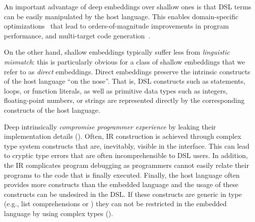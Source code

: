   An important advantage of deep embeddings over shallow ones is that DSL
  terms can be easily manipulated by the host language. This enables domain-specific
  optimizations~\cite{rompf_lightweight_2012,rompf_optimizing_2013}
  that lead to orders-of-magnitude improvements in program performance, and
  multi-target code generation~\cite{brown_heterogeneous_2011}.
%


On the other hand, shallow embeddings typically suffer less from
\emph{linguistic mismatch}: this is particularly obvious for a class of shallow embeddings that we refer to as \emph{direct} embeddings. Direct embeddings preserve the intrinsic constructs of the host language ``on the nose''. That is, DSL
constructs such as  statements, loops, or function literals, as well
as primitive data types such as integers, floating-point numbers, or strings
are represented directly by the corresponding constructs of the host language.
%



Deep \edsls{} intrinsically \emph{compromise programmer experience} by leaking their
implementation details (). Often, IR construction
is achieved through complex type system constructs that are, inevitably,
visible in the \edsl interface. This can lead to cryptic type errors
that are often incomprehensible to DSL users.
In addition, the IR complicates program debugging as programmers cannot easily
relate their programs to the code that is finally executed. Finally, the host
language often provides more constructs than the embedded language and the usage
of these constructs can be undesired in the DSL. If these constructs are generic in type
(e.g., list comprehensions or ) they can not be restricted in the embedded
language by using complex types ().

